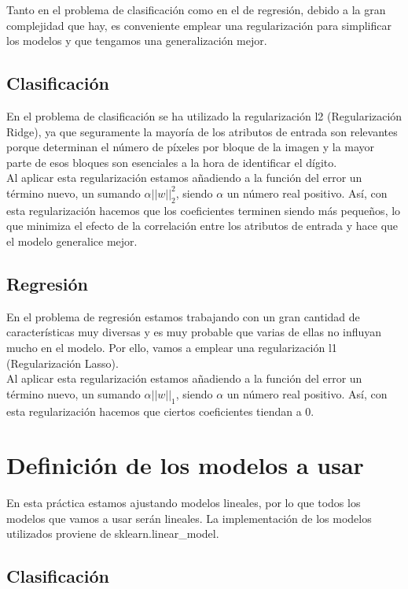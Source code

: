 \documentclass[12pt]{article}
\begin{document}
Tanto en el problema de clasificación como en el de regresión, debido a la gran complejidad que hay, es conveniente emplear una regularización para simplificar los modelos y que tengamos una generalización mejor.

\subsection{Clasificación}

En el problema de clasificación se ha utilizado la regularización l2 (Regularización Ridge), ya que seguramente la mayoría de los atributos de entrada son relevantes porque determinan el número de píxeles por bloque de la imagen y la mayor parte de esos bloques son esenciales a la hora de identificar el dígito.\\

Al aplicar esta regularización estamos añadiendo a la función del error un término nuevo, un sumando $\alpha ||w||_2^2$, siendo $\alpha$ un número real positivo. Así, con esta regularización hacemos que los coeficientes terminen siendo más pequeños, lo que minimiza el efecto de la correlación entre los atributos de entrada y hace que el modelo generalice mejor.

\subsection{Regresión}

En el problema de regresión estamos trabajando con un gran cantidad de características muy diversas y es muy probable que varias de ellas no influyan mucho en el modelo. Por ello, vamos a emplear una regularización l1 (Regularización Lasso).\\

Al aplicar esta regularización estamos añadiendo a la función del error un término nuevo, un sumando $\alpha ||w||_1$, siendo $\alpha$ un número real positivo. Así, con esta regularización hacemos que ciertos coeficientes tiendan a $0$.

\section{Definición de los modelos a usar}

En esta práctica estamos ajustando modelos lineales, por lo que todos los modelos que vamos a usar serán lineales. La implementación de los modelos utilizados proviene de  sklearn.linear\_model. 

\subsection{Clasificación}
\end{document}
